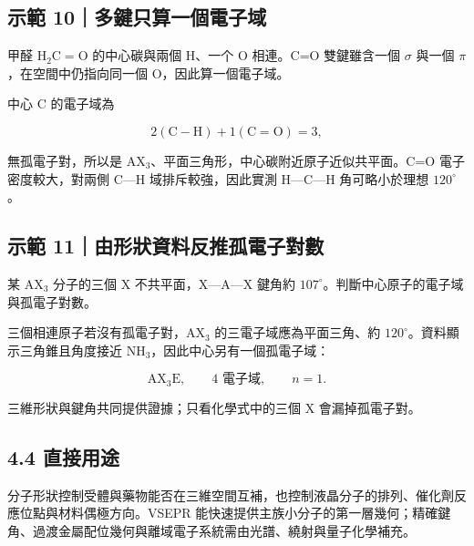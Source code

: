 \documentclass[11pt,a4paper]{article}
\begin{document}
\begin{HandoutWorkedExample}

\subsection{示範 10｜多鍵只算一個電子域}\label{ux793aux7bc4-10ux591aux9375ux53eaux7b97ux4e00ux500bux96fbux5b50ux57df}

甲醛 \(\mathrm{H_2C=O}\) 的中心碳與兩個 H、一个 O 相連。C=O 雙鍵雖含一個 \(\sigma\) 與一個 \(\pi\)，在空間中仍指向同一個 O，因此算一個電子域。

中心 C 的電子域為

\[
2(\mathrm{C-H})+1(\mathrm{C=O})=3,
\]

無孤電子對，所以是 AX\(_3\)、平面三角形，中心碳附近原子近似共平面。C=O 電子密度較大，對兩側 C---H 域排斥較強，因此實測 H---C---H 角可略小於理想 \(120^\circ\)。

\end{HandoutWorkedExample}

\begin{HandoutWorkedExample}

\subsection{示範 11｜由形狀資料反推孤電子對數}\label{ux793aux7bc4-11ux7531ux5f62ux72c0ux8cc7ux6599ux53cdux63a8ux5b64ux96fbux5b50ux5c0dux6578}

某 AX\(_3\) 分子的三個 X 不共平面，X---A---X 鍵角約 \(107^\circ\)。判斷中心原子的電子域與孤電子對數。

三個相連原子若沒有孤電子對，AX\(_3\) 的三電子域應為平面三角、約 \(120^\circ\)。資料顯示三角錐且角度接近 NH\(_3\)，因此中心另有一個孤電子域：

\[
\mathrm{AX_3E},\qquad 4\text{ 電子域},\qquad n=1.
\]

三維形狀與鍵角共同提供證據；只看化學式中的三個 X 會漏掉孤電子對。

\end{HandoutWorkedExample}

\subsection{4.4 直接用途}\label{ux76f4ux63a5ux7528ux9014-1}

分子形狀控制受體與藥物能否在三維空間互補，也控制液晶分子的排列、催化劑反應位點與材料偶極方向。VSEPR 能快速提供主族小分子的第一層幾何；精確鍵角、過渡金屬配位幾何與離域電子系統需由光譜、繞射與量子化學補充。
\end{document}
